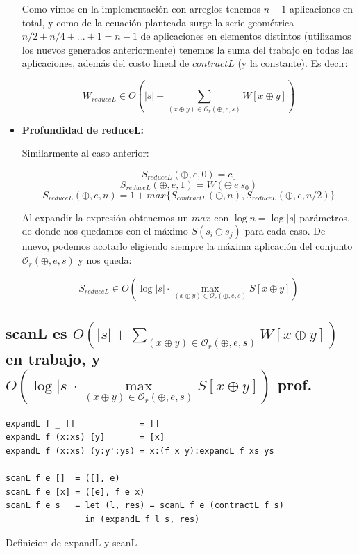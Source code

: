\documentclass[12pt]{article}
\begin{document}
\begin{itemize}
    Como vimos en la implementación con arreglos tenemos $n-1$ aplicaciones en total, y como de la ecuación planteada surge la serie geométrica $n/2 + n/4 + ... + 1 = n-1$ de aplicaciones en elementos distintos (utilizamos los nuevos generados anteriormente) tenemos la suma del trabajo en todas las aplicaciones, además del costo lineal de $contractL$ (y la constante). Es decir:
    
    $$ W_{reduceL} \in O(|s| + \sum\limits_{(x\oplus y)\in\mathcal{O}_r(\oplus,e,s)} W[x\oplus y]) $$

\item \textbf{Profundidad de reduceL:}

    Similarmente al caso anterior:
    
    $$ S_{reduceL}(\oplus, e, 0) = c_0 $$
    $$ S_{reduceL}(\oplus, e, 1) = W(\oplus\ e\ s_0) $$
    $$ S_{reduceL}(\oplus, e, n) = 1 + max\{ S_{contractL}(\oplus, n), S_{reduceL}(\oplus, e, n/2) \} $$
    
    Al expandir la expresión obtenemos un $max$ con $\log n = \log |s|$ parámetros, de donde nos quedamos con el máximo $S(s_i \oplus s_j)$ para cada caso. De nuevo, podemos acotarlo eligiendo siempre la máxima aplicación del conjunto $\mathcal{O}_r(\oplus,e,s)$ y nos queda:

    $$ S_{reduceL} \in O(\log |s|\cdot \max\limits_{(x\oplus y)\in\mathcal{O}_r(\oplus,e,s)} S[x\oplus y]) $$
    
\end{itemize}


\subsection{scanL es $O(|s| + \sum\limits_{(x\oplus y)\in\mathcal{O}_r(\oplus,e,s)} W[x\oplus y])$ en trabajo, y $O(\log |s|\cdot \max\limits_{(x\oplus y)\in\mathcal{O}_r(\oplus,e,s)} S[x\oplus y])$ prof.}

\begin{table}[h]
\begin{lstlisting}
expandL f _ []             = []
expandL f (x:xs) [y]       = [x]
expandL f (x:xs) (y:y':ys) = x:(f x y):expandL f xs ys

scanL f e []  = ([], e)
scanL f e [x] = ([e], f e x)
scanL f e s   = let (l, res) = scanL f e (contractL f s) 
                in (expandL f l s, res)
\end{lstlisting}

\caption{Definicion de expandL y scanL}
\end{table}
\end{document}
